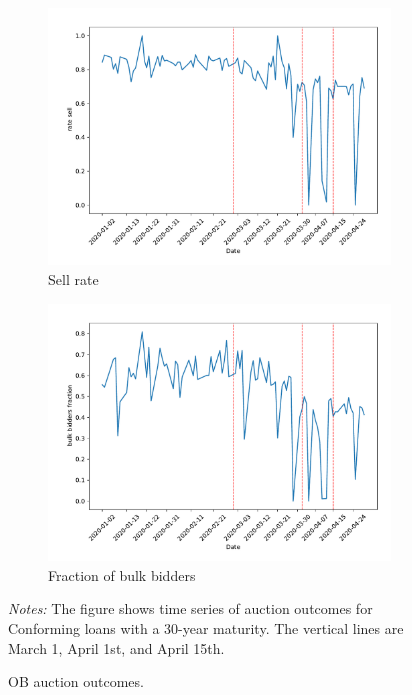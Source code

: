\documentclass[11pt,a4paper]{article}
\begin{document}
\begin{figure}[h]
\begin{subfigure}[b]{0.49\textwidth}
      \includegraphics[width=0.998\textwidth]{../results/figures/dummy_sell_any_mean_mat30_loan1_timeseries_nr_1_7.pdf}
      \caption{ Sell rate}
     \end{subfigure}
     \begin{subfigure}[b]{0.49\textwidth}
      \includegraphics[width=0.998\textwidth]{../results/figures/bulk_bidders_fraction_mean_mat30_loan1_timeseries_nr_1_7.pdf}
      \caption{ Fraction of bulk bidders}
     \end{subfigure}
     \caption{OB auction outcomes. } 
   \begin{minipage}{\textwidth}
      \footnotesize{\textit{Notes:} The figure shows time series of auction outcomes for Conforming loans with a 30-year maturity. The vertical lines are March 1, April 1st, and April 15th.  } 
      \end{minipage}
\end{figure}
\end{document}
